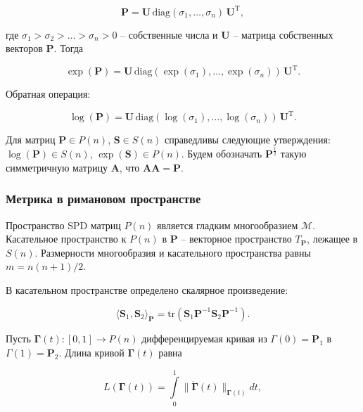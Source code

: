 \documentclass{article}
\begin{document}
\begin{equation}
    \mathbf{P} = \mathbf{U} \, \text{diag}(\sigma_1, \ldots, \sigma_n) \, \mathbf{U}^\text{T}, 
\end{equation}

где $\sigma_1 > \sigma_2 > \ldots > \sigma_n > 0$ -- собственные числа и $\mathbf{U}$ -- матрица собственных векторов $\mathbf{P}$. Тогда

\begin{equation}
    \exp(\mathbf{P}) = \mathbf{U} \, \text{diag}(\exp(\sigma_1), \ldots, \exp(\sigma_n)) \, \mathbf{U}^\text{T}.
\end{equation}

Обратная операция:

\begin{equation}
    \log(\mathbf{P}) = \mathbf{U} \, \text{diag}(\log(\sigma_1), \ldots, \log(\sigma_n)) \, \mathbf{U}^\text{T}.
\end{equation}

Для матриц $\mathbf{P} \in P(n)$, $\mathbf{S} \in S(n)$ справедливы следующие утверждения: $\log(\mathbf{P}) \in S(n)$, $\exp(\mathbf{S}) \in P(n)$. Будем обозначать $\mathbf{P}^{\frac12}$ такую симметричную матрицу $\mathbf{A}$, что $\mathbf{A}\mathbf{A} = \mathbf{P}$. 

\subsubsection{Метрика в римановом пространстве}

Пространство SPD матриц $P(n)$ является гладким многообразием $\mathcal{M}$. Касательное пространство к $P(n)$ в $\mathbf{P}$ -- векторное пространство $T_{\mathbf{P}}$, лежащее в $S(n)$. Размерности многообразия и касательного пространства равны $m = n(n + 1) / 2$. 

В касательном пространстве определено скалярное произведение:

\begin{equation}
    \langle \mathbf{S}_1, \mathbf{S}_2 \rangle_{\mathbf{P}} = \text{tr}(\mathbf{S}_1\mathbf{P}^{-1}\mathbf{S}_2\mathbf{P}^{-1}).
\end{equation}

Пусть $\mathbf{\Gamma}(t) : [0, 1] \rightarrow P(n)$ дифференцируемая кривая из $\Gamma(0) = \mathbf{P}_1$ в $\Gamma(1) = \mathbf{P}_2$. Длина кривой $\mathbf{\Gamma}(t)$ равна

\begin{equation}
    L(\mathbf{\Gamma}(t)) = \int\limits_{0}^1 \|\dot{\mathbf{\Gamma}}(t)\|_{\mathbf{\Gamma}(t)}dt,
\end{equation}
\end{document}
